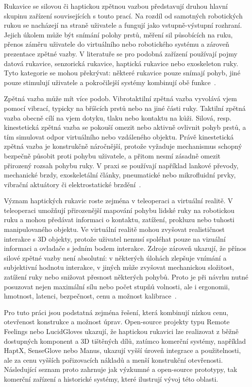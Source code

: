 \documentclass[FZS,DP]{tulthesis}
\begin{document}
Rukavice se silovou či haptickou zpětnou vazbou představují druhou hlavní skupinu zařízení souvisejících s touto prací. Na rozdíl od samotných robotických rukou se nacházejí na straně uživatele a fungují jako vstupně-výstupní rozhraní. Jejich úkolem může být snímání polohy prstů, měření sil působících na ruku, přenos záměru uživatele do virtuálního nebo robotického systému a zároveň prezentace zpětné vazby. V literatuře se pro podobná zařízení používají pojmy datová rukavice, senzorická rukavice, haptická rukavice nebo exoskeleton ruky. Tyto kategorie se mohou překrývat: některé rukavice pouze snímají pohyb, jiné pouze stimulují uživatele a pokročilejší systémy kombinují obě funkce~\cite{Belcamino2024,Krycner2024,GIUDICI2025}.

Zpětná vazba může mít více podob. Vibrotaktilní zpětná vazba vyvolává vjem pomocí vibrací, typicky na bříšcích prstů nebo na jiné části ruky. Taktilní zpětná vazba obecně cílí na vjem dotyku, tlaku nebo kontaktu na kůži. Silová, resp. kinestetická zpětná vazba se pokouší omezit nebo aktivně ovlivnit pohyb prstů, a tím simulovat odpor virtuálního nebo vzdáleného objektu. Právě kinestetická zpětná vazba je konstrukčně náročnější, protože vyžaduje mechanismus schopný bezpečně působit proti pohybu uživatele, a přitom nesmí zásadně omezit přirozený rozsah pohybu ruky. V praxi se používají například lankové převody, mechanické brzdy, exoskeletální články, pneumatické nebo mikrofluidní prvky, vibrační aktuátory či elektrostatické brzdění~\cite{Li2025,Zhang2025,GIUDICI2025}.

Význam haptických rukavic roste zejména v teleoperaci a virtuální realitě. V teleoperaci umožňují přirozenější mapování pohybu lidské ruky na robotickou ruku a mohou předávat informaci o kontaktu, zatížení, prokluzu nebo tuhosti manipulovaného objektu. Ve virtuální realitě mohou zvyšovat realističnost interakce s 3D objekty, protože uživatel nemusí spoléhat pouze na vizuální informaci a ovladače s jedním bodem interakce. Zdroje zároveň ukazují, že přínos silové zpětné vazby není absolutní: v některých úlohách zlepšuje vnímání a subjektivní hodnotu interakce, v jiných může zvyšovat mechanickou složitost, zatížení ruky nebo snižovat přesnost některých pohybů. Proto je při návrhu nutné posuzovat nejen maximální sílu nebo počet stupňů volnosti, ale i ergonomii, hmotnost, latenci, bezpečnost, cenu a možnost kalibrace~\cite{Li2025,Thomas2023110,Zhang2025}.

Pro tuto práci jsou podstatná zejména řešení, která kombinují nízkou cenu, otevřenost konstrukce a možnost úprav. Open-source projekty typu Remote Feelings nebo LucidGloves ukazují, že haptickou rukavici lze realizovat z běžně dostupných komponent a 3D tištěných dílů, zatímco komerční systémy, například HaptX, SenseGlove nebo Manus, ukazují vyšší úroveň integrace a použitelnosti, ale za cenu vyšších pořizovacích nákladů a menší konstrukční otevřenosti. Následující seznam proto zahrnuje jak výzkumné a open-source prototypy, tak komerční zařízení a historické systémy, které ilustrují vývoj této oblasti.
\end{document}
